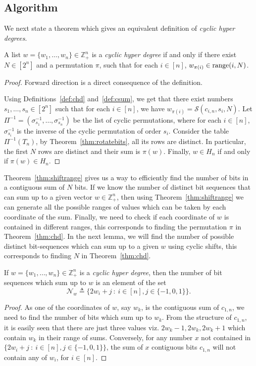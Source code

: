 \subsection{Algorithm}
We next state a theorem which gives an equivalent definition of {\em cyclic hyper degrees}.
\begin{theorem}
\label{thm:chd}
A list $w=\{w_1,\dots,w_n\}\in \mathbb{Z}_+^n$ is a {\em cyclic hyper degree} if and only if there exist $N\in[2^n]$ and a permutation $\pi$, such that for each $i\in [n]$, $w_{\pi(i)} \in {\rm range}(i,N)$.%
\end{theorem}

\begin{proof}
 Forward direction is a direct consequence of the definition.
 
 Using Definitions~\ref{def:chd} and~\ref{def:csum}, we get that there exist numbers $s_1,\dots,s_n \in [2^n]$ such that for each $i\in [n]$, we have $w_{\pi(i)}=\mathcal{S}(c_{i,n},s_i,N)$. Let $\Pi^{-1}=(\sigma_{s_1}^{-1},\dots,\sigma_{s_n}^{-1})$ be the list of cyclic permutations, where for each $i\in [n]$, $\sigma_{s_i}^{-1}$ is the inverse of the cyclic permutation of order $s_i$. Consider the table $\Pi^{-1}(T_n)$, by
 Theorem~\ref{thm:rotatebits}, all its rows are distinct. In particular, the first $N$ rows are distinct and their sum is $\pi(w)$. Finally, $w\in H_n$ if and only if $\pi(w)\in H_n$.
\end{proof}

Theorem~\ref{thm:shiftrange} gives us a way to efficiently find the number of bits in a contiguous sum of $N$ bits. If we know the number of distinct bit sequences that can sum up to a given vector $w\in \mathbb{Z}_+^n$, then using Theorem~\ref{thm:shiftrange} we can generate all the possible ranges of values which can be taken by each coordinate of the sum. Finally, we need to check if each coordinate of $w$ is contained in different ranges, this corresponds to finding the permutation $\pi$ in Theorem~\ref{thm:chd}. In the next lemma, we will find the number of possible  distinct bit-sequences which can sum up to a given $w$ using cyclic shifts, this corresponds to finding $N$ in Theorem~\ref{thm:chd}.
\begin{lemma}
\label{lem:set-size}
If $w=\{w_1,\dots,w_n\}\in \mathbb{Z}_+^n$ is a {\em cyclic hyper degree}, then the number of bit sequences which sum up to $w$ is an element of the set
$$\mathcal{N}_w\triangleq \{2w_i+j~:~i\in[n], j\in \{-1,0,1\}\}.$$
\end{lemma}
\begin{proof}
 As one of the coordinates of $w$, say $w_k$, is the contiguous sum of $c_{1,n}$, we need to find the number of bits which sum up to $w_k$. From the structure of $c_{1,n}$, it is easily seen that there are just three values viz. $2w_k-1,2w_k,2w_k+1$ which contain $w_k$ in their range of sums. Conversely, for any number $x$ not contained in $\{2w_i+j~:~i\in[n], j\in \{-1,0,1\}\}$, the sum of $x$ contiguous bits $c_{1,n}$ will not contain any of $w_i$, for $i\in [n]$.
\end{proof}

